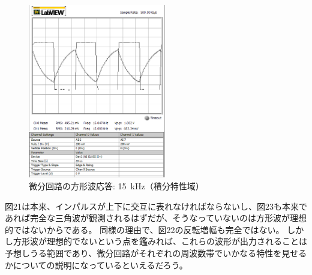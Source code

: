 \documentclass[10pt,a4j,dvipdfmx]{jsarticle}
\begin{document}
  \begin{figure}[H]
    \centering
    \includegraphics[width=6cm]{dif_Rr_Cf_15k_step.png}
    \caption{微分回路の方形波応答: \SI{15}{\kilo\hertz}（積分特性域）}
  \end{figure}

図21は本来、インパルスが上下に交互に表れなければならないし、図23も本来であれば完全な三角波が観測されるはずだが、そうなっていないのは方形波が理想的ではないからである。
同様の理由で、図22の反転増幅も完全ではない。
しかし方形波が理想的でないという点を鑑みれば、これらの波形が出力されることは予想しうる範囲であり、微分回路がそれぞれの周波数帯でいかなる特性を見せるかについての説明になっているといえるだろう。
\end{document}
